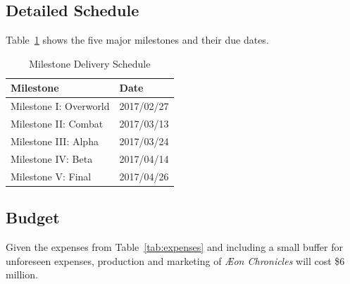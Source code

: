 \documentclass[12pt,titlepage]{article}
\newcommand\gametitle{\textit{\AE on Chronicles}\xspace}
\begin{document}
\subsection{Detailed Schedule}
Table~\ref{tab:milestones} shows the five major milestones and their due dates.
\begin{table}[H]
    \caption{Milestone Delivery Schedule}
    \label{tab:milestones}
    \centering
    \begin{tabular}{|l|l|}
        \hline
        \textbf{Milestone} & \textbf{Date} \\
        \hline\hline
        Milestone I: Overworld & 2017/02/27 \\
        \hline
        Milestone II: Combat & 2017/03/13 \\
        \hline
        Milestone III: Alpha & 2017/03/24 \\
        \hline
        Milestone IV: Beta & 2017/04/14 \\
        \hline
        Milestone V: Final & 2017/04/26 \\
        \hline
    \end{tabular}
\end{table}


\subsection{Budget}
Given the expenses from Table~\ref{tab:expenses} and including a small buffer
for unforeseen expenses, production and marketing of \gametitle will cost \$6
million.
\end{document}
